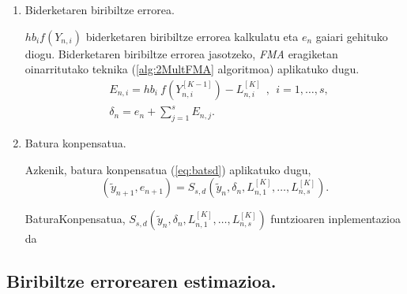 \begin{enumerate}
\item Biderketaren biribiltze errorea.

$hb_i f(Y_{n,i})$ biderketaren biribiltze errorea kalkulatu eta $e_{n}$ gaiari gehituko diogu. Biderketaren biribiltze errorea jasotzeko,  \emph{FMA} eragiketan oinarritutako teknika (\ref{alg:2MultFMA} algoritmoa) aplikatuko dugu. 
\begin{align*}
&E_{n,i}=hb_i \ f(Y^{[K-1]}_{n,i}) - L^{[K]}_{n,i} \ \ , \ \ i=1,\dots,s,\\
&\delta_{n}={e}_{n} + \sum\limits_{j=1}^{s}E_{n,j}.
\end{align*}


\item Batura konpensatua.

Azkenik, batura konpensatua (\ref{eq:batsd}) aplikatuko dugu,
\begin{equation}
\label{eq:bkLn}
(\tilde y_{n+1}, e_{n+1}) = S_{s,d}(\tilde y_n, \delta_n, L_{n,1}^{[K]}, \dots,L_{n,s}^{[K]}).
\end{equation}

\begin{algorithm}[H]
  \SetAlgoLined\DontPrintSemicolon
  \caption{BaturaKonpensatua,  $S_{s,d}(\tilde y_n, \delta_n, L_{n,1}^{[K]}, \dots,L_{n,s}^{[K]})$ funtzioaren inplementazioa da}
\end{algorithm} 

\end{enumerate}


\subsection{Biribiltze errorearen estimazioa.}
\label{ss:634}

